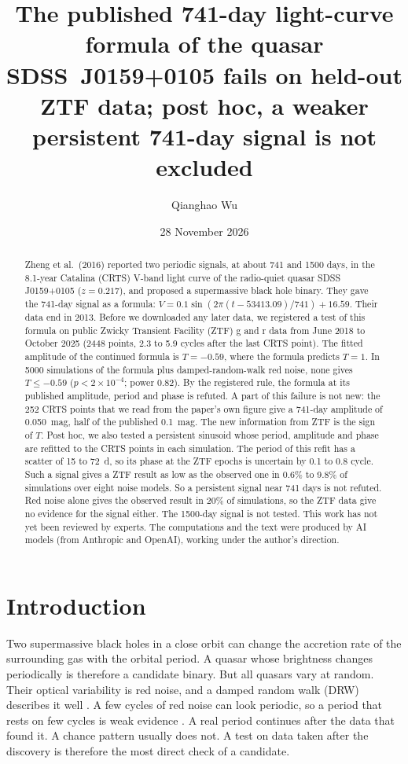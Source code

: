 \documentclass[11pt]{article}
\title{The published 741-day light-curve formula of the quasar SDSS~J0159+0105 fails on held-out ZTF data; post hoc, a weaker persistent 741-day signal is not excluded}
\author{Qianghao Wu}
\date{28 November 2026}
\begin{document}
\maketitle

\begin{abstract}
\noindent Zheng et al.\ (2016) reported two periodic signals, at about 741 and 1500 days, in the 8.1-year Catalina (CRTS) V-band light curve of the radio-quiet quasar SDSS J0159+0105 ($z = 0.217$), and proposed a supermassive black hole binary. They gave the 741-day signal as a formula: $V = 0.1 \sin(2\pi(t - 53413.09)/741) + 16.59$. Their data end in 2013. Before we downloaded any later data, we registered a test of this formula on public Zwicky Transient Facility (ZTF) g and r data from June 2018 to October 2025 (2448 points, 2.3 to 5.9 cycles after the last CRTS point). The fitted amplitude of the continued formula is $T = -0.59$, where the formula predicts $T = 1$. In 5000 simulations of the formula plus damped-random-walk red noise, none gives $T \le -0.59$ ($p < 2\times10^{-4}$; power 0.82). By the registered rule, the formula at its published amplitude, period and phase is refuted. A part of this failure is not new: the 252 CRTS points that we read from the paper's own figure give a 741-day amplitude of 0.050~mag, half of the published 0.1~mag. The new information from ZTF is the sign of $T$. Post hoc, we also tested a persistent sinusoid whose period, amplitude and phase are refitted to the CRTS points in each simulation. The period of this refit has a scatter of 15 to 72~d, so its phase at the ZTF epochs is uncertain by 0.1 to 0.8 cycle. Such a signal gives a ZTF result as low as the observed one in 0.6\% to 9.8\% of simulations over eight noise models. So a persistent signal near 741 days is not refuted. Red noise alone gives the observed result in 20\% of simulations, so the ZTF data give no evidence for the signal either. The 1500-day signal is not tested. This work has not yet been reviewed by experts. The computations and the text were produced by AI models (from Anthropic and OpenAI), working under the author's direction.
\end{abstract}

\section{Introduction}

Two supermassive black holes in a close orbit can change the accretion rate of the surrounding gas with the orbital period. A quasar whose brightness changes periodically is therefore a candidate binary. But all quasars vary at random. Their optical variability is red noise, and a damped random walk (DRW) describes it well \cite{kelly2009,macleod2010}. A few cycles of red noise can look periodic, so a period that rests on few cycles is weak evidence \cite{vaughan2016}. A real period continues after the data that found it. A chance pattern usually does not. A test on data taken after the discovery is therefore the most direct check of a candidate.
\end{document}

